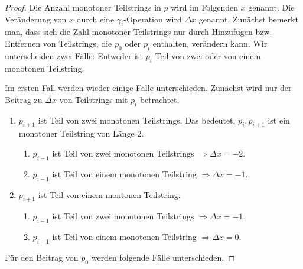 \documentclass[a4paper, 11pt, ngerman]{article}
\begin{document}
\begin{proof}
    Die Anzahl monotoner Teilstrings in $p$ wird im Folgenden $x$ genannt. Die Veränderung von $x$ durch eine $\gamma_i$-Operation wird $\Delta x$ genannt. Zunächst bemerkt man, dass sich die Zahl monotoner Teilstrings nur durch Hinzufügen bzw. Entfernen von Teilstrings, die $p_0$ oder $p_i$ enthalten, verändern kann. Wir unterscheiden zwei Fälle: Entweder ist $p_i$ Teil von zwei oder von einem monotonen Teilstring.

    Im ersten Fall werden wieder einige Fälle unterschieden. Zunächst wird nur der Beitrag zu $\Delta x$ von Teilstrings mit $p_i$ betrachtet.

    \begin{enumerate}
        \item $p_{i + 1}$ ist Teil von zwei monotonen Teilstrings. Das bedeutet, $p_i, p_{i + 1}$ ist ein monotoner Teilstring von Länge 2.
              \begin{enumerate}
                  \item $p_{i - 1}$ ist Teil von zwei monotonen Teilstrings $\Longrightarrow \Delta x = - 2$.
                  \item $p_{i - 1}$ ist Teil von einem monotonen Teilstring $\Longrightarrow \Delta x = - 1$.
              \end{enumerate}
        \item $p_{i + 1}$ ist Teil von einem montonen Teilstring.
              \begin{enumerate}
                  \item $p_{i - 1}$ ist Teil von zwei monotonen Teilstrings $\Longrightarrow \Delta x = - 1$.
                  \item $p_{i - 1}$ ist Teil von einem monotonen Teilstring $\Longrightarrow \Delta x = 0$.
              \end{enumerate}
    \end{enumerate}

    \noindent   Für den Beitrag von $p_0$ werden folgende Fälle unterschieden.


\end{proof}
\end{document}
